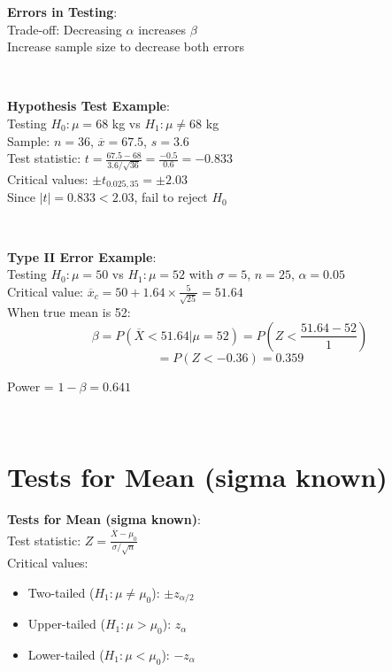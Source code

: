 \documentclass{article}
\newenvironment{cheatformula}[1][Title]{
    \begin{minipage}{\linewidth}
    \textbf{#1}:\\
}{
    \end{minipage}\\[2ex]
}
\begin{document}
\begin{multicols*}{2}
\begin{cheatformula}[Errors in Testing]
    Trade-off: Decreasing $\alpha$ increases $\beta$\\
    Increase sample size to decrease both errors
\end{cheatformula}

\begin{cheatformula}[Hypothesis Test Example]
    Testing $H_0: \mu = 68$ kg vs $H_1: \mu \neq 68$ kg\\
    Sample: $n = 36$, $\overline{x} = 67.5$, $s = 3.6$\\
    
    Test statistic: $t = \frac{67.5 - 68}{3.6/\sqrt{36}} = \frac{-0.5}{0.6} = -0.833$\\
    
    Critical values: $\pm t_{0.025,35} = \pm 2.03$\\
    
    Since $|t| = 0.833 < 2.03$, fail to reject $H_0$
\end{cheatformula}

\begin{cheatformula}[Type II Error Example]
    Testing $H_0: \mu = 50$ vs $H_1: \mu = 52$ with $\sigma = 5$, $n = 25$, $\alpha = 0.05$\\
    
    Critical value: $\overline{x}_c = 50 + 1.64 \times \frac{5}{\sqrt{25}} = 51.64$\\
    
    When true mean is 52:
    $$\beta = P(\overline{X} < 51.64 | \mu = 52) = P\left(Z < \frac{51.64-52}{1}\right)$$
    $$= P(Z < -0.36) = 0.359$$
    
    Power = $1 - \beta = 0.641$
\end{cheatformula}

\section{Tests for Mean (sigma known)}

\begin{cheatformula}[Tests for Mean (sigma known)]
    Test statistic: $Z = \frac{\overline{X} - \mu_0}{\sigma/\sqrt{n}}$\\
    
    Critical values:
    \begin{itemize}
        \item Two-tailed ($H_1: \mu \neq \mu_0$): $\pm z_{\alpha/2}$
        \item Upper-tailed ($H_1: \mu > \mu_0$): $z_\alpha$
        \item Lower-tailed ($H_1: \mu < \mu_0$): $-z_\alpha$
    \end{itemize}
\end{cheatformula}


\end{multicols*}
\end{document}
